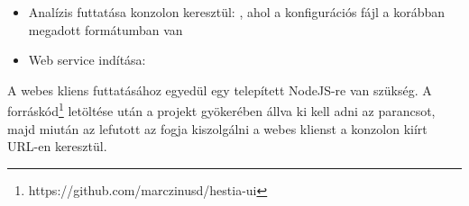 \begin{itemize}
    \item Analízis futtatása konzolon keresztül: , ahol a konfigurációs fájl a korábban megadott formátumban van
    \item Web service indítása: 
\end{itemize}

A webes kliens futtatásához egyedül egy telepített NodeJS-re van szükség. A forráskód\footnote{https://github.com/marczinusd/hestia-ui} letöltése után a projekt gyökerében állva ki kell adni az  parancsot, majd miután az lefutott az  fogja kiszolgálni a webes klienst a konzolon kiírt URL-en keresztül.
